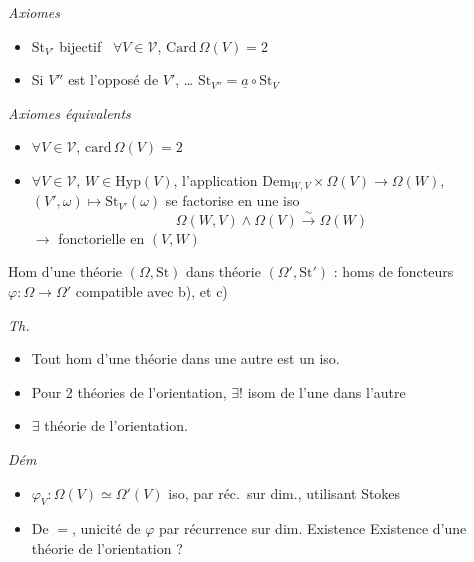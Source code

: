 \documentclass[11pt,a4paper]{article}
\begin{document}
\emph{Axiomes}
\begin{itemize}
  \item[1)] $\mathrm{St}_{V'}$ bijectif 
  \ $\forall V \in \mathcal{V}$, $\mathrm{Card}\, \Omega(V) = 2$
  \item[2)] Si $V''$ est l'opposé de $V'$, …
  $\mathrm{St}_{V''} = \underline{a} \circ \mathrm{St}_V$
\end{itemize}

\emph{Axiomes équivalents}
\begin{itemize}
  \item[1)] $\forall V \in \mathcal{V}$, $\mathrm{card}\, \Omega(V) = 2$
  \item[2)] $\forall V \in \mathcal{V}$, $W \in \mathrm{Hyp}(V)$,
   l'application
   $\mathrm{Dem}_{W,V} \times \Omega(V) \to \Omega(W)$,
  $(V', \omega) \mapsto \mathrm{St}_{V'}(\omega)$ se factorise en une
   iso
  \[
  \Omega(W, V) \wedge \Omega(V) \xrightarrow{\sim} \Omega(W)
  \]
  $\to$ fonctorielle en $(V, W)$
\end{itemize}

 Hom d'une théorie $(\Omega, \mathrm{St})$ dans théorie
$(\Omega', \mathrm{St}')$ : homs de foncteurs $\varphi : \Omega \to \Omega'$
compatible avec b), et c)

\emph{Th.}
\begin{itemize}
  \item[a)] Tout hom d'une théorie dans une autre est un iso.
  \item[b)] Pour 2 théories de l'orientation, $\exists !$ isom de l'une dans
  l'autre
  \item[c)] $\exists$ théorie de l'orientation.
\end{itemize}

\emph{Dém}
\begin{itemize}
  \item[a)] $\varphi_V : \Omega(V) \simeq \Omega'(V)$ iso, par réc.\ sur dim.,
  utilisant Stokes
  \item[b)] De $=$, unicité de $\varphi$ par récurrence sur dim. Existence
  \ill{}  Existence d'une théorie de
  l'orientation ?
\end{itemize}
\end{document}

